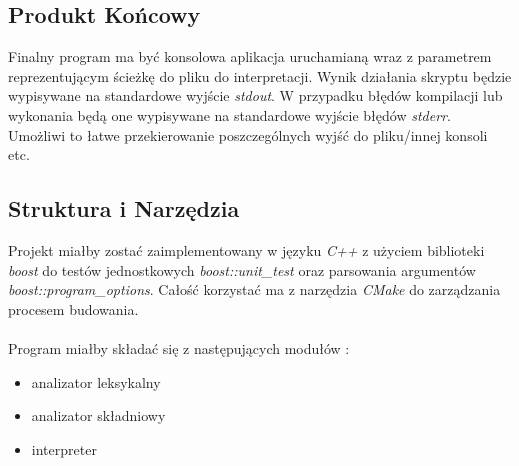 \documentclass[11pt]{article} %
\begin{document}
\subsection{Produkt Końcowy}
Finalny program ma być konsolowa aplikacja uruchamianą wraz z parametrem reprezentującym ścieżkę do pliku do interpretacji. Wynik działania skryptu będzie wypisywane na standardowe wyjście \textsl{stdout}. W przypadku błędów kompilacji lub wykonania będą one wypisywane na standardowe wyjście błędów \textsl{stderr}. Umożliwi to łatwe przekierowanie poszczególnych wyjść do pliku/innej konsoli etc.
\subsection{Struktura i Narzędzia}
Projekt miałby zostać zaimplementowany w języku \textit{C++} z użyciem biblioteki \textit{boost} do testów jednostkowych \textit{boost::unit\_test} oraz parsowania argumentów \textit{boost::program\_options}. Całość korzystać ma z narzędzia \textit{CMake} do zarządzania procesem budowania.
\paragraph{}
Program miałby składać się z następujących modułów : 
\begin{itemize}
	\item analizator leksykalny
	\item analizator składniowy
	\item interpreter
\end{itemize}
\end{document}
